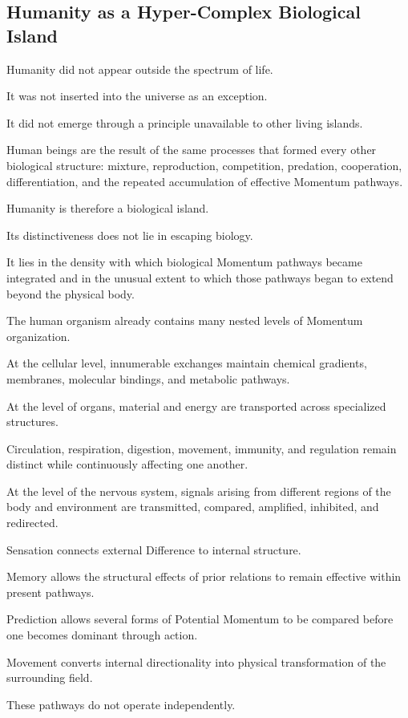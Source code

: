 \subsection*{\textbf{Humanity as a Hyper-Complex Biological Island}}

Humanity did not appear outside the spectrum of life.

It was not inserted into the universe as an exception.

It did not emerge through a principle unavailable to other living islands.

Human beings are the result of the same processes that formed every other biological structure: mixture, reproduction, competition, predation, cooperation, differentiation, and the repeated accumulation of effective Momentum pathways.

Humanity is therefore a biological island.

Its distinctiveness does not lie in escaping biology.

It lies in the density with which biological Momentum pathways became integrated and in the unusual extent to which those pathways began to extend beyond the physical body.

The human organism already contains many nested levels of Momentum organization.

At the cellular level, innumerable exchanges maintain chemical gradients, membranes, molecular bindings, and metabolic pathways.

At the level of organs, material and energy are transported across specialized structures.

Circulation, respiration, digestion, movement, immunity, and regulation remain distinct while continuously affecting one another.

At the level of the nervous system, signals arising from different regions of the body and environment are transmitted, compared, amplified, inhibited, and redirected.

Sensation connects external Difference to internal structure.

Memory allows the structural effects of prior relations to remain effective within present pathways.

Prediction allows several forms of Potential Momentum to be compared before one becomes dominant through action.

Movement converts internal directionality into physical transformation of the surrounding field.

These pathways do not operate independently.

